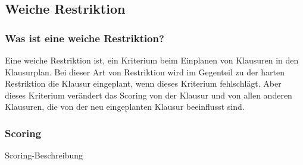 \subsection{Weiche Restriktion}\label{subsec:weiche_restriktion}

\subsubsection{Was ist eine weiche Restriktion?}
Eine weiche Restriktion ist, ein Kriterium beim Einplanen von Klausuren in den Klausurplan.
Bei dieser Art von Restriktion wird im Gegenteil zu der harten Restriktion die Klausur eingeplant,
wenn dieses Kriterium fehlschlägt.
Aber dieses Kriterium verändert das Scoring von der Klausur und von allen anderen Klausuren, die von
der neu eingeplanten Klausur beeinflusst sind.

\subsubsection{Scoring}
Scoring-Beschreibung



